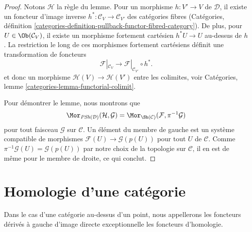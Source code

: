 \begin{proof}
Notons $\mathcal{H}$ la règle du lemme. Pour un morphisme
$h : V' \to V$ de $\mathcal{D}$, il existe un foncteur d'image inverse
$h^* : \mathcal{C}_V \to \mathcal{C}_{V'}$ des catégories fibres
(Catégories, définition
\ref{categories-definition-pullback-functor-fibred-category}).
De plus, pour $U \in \Ob(\mathcal{C}_V)$, il existe un morphisme fortement
cartésien $h^*U \to U$ au-dessus de $h$. La restriction le long de ces
morphismes fortement cartésiens définit une transformation de foncteurs
$$
\mathcal{F}|_{\mathcal{C}_V}
\longrightarrow
\mathcal{F}|_{\mathcal{C}_{V'}} \circ h^*.
$$
et donc un morphisme $\mathcal{H}(V) \to \mathcal{H}(V')$ entre les
colimites, voir Catégories, lemme
\ref{categories-lemma-functorial-colimit}.

\medskip\noindent
Pour démontrer le lemme, nous montrons que
$$
\Mor_{\textit{PSh}(\mathcal{D})}(\mathcal{H}, \mathcal{G}) =
\Mor_{\Sh(\mathcal{C})}(\mathcal{F}, \pi^{-1}\mathcal{G})
$$
pour tout faisceau $\mathcal{G}$ sur $\mathcal{C}$. Un élément du membre de
gauche est un système compatible de morphismes
$\mathcal{F}(U) \to \mathcal{G}(p(U))$ pour tout $U$ de $\mathcal{C}$.
Comme $\pi^{-1}\mathcal{G}(U) = \mathcal{G}(p(U))$ par notre choix de la
topologie sur $\mathcal{C}$, il en est de même pour le membre de droite, ce
qui conclut.
\end{proof}





\section{Homologie d'une catégorie}
\label{section-homology}

\noindent
Dans le cas d'une catégorie au-dessus d'un point, nous appellerons les
foncteurs dérivés à gauche d'image directe exceptionnelle les foncteurs
d'homologie.

